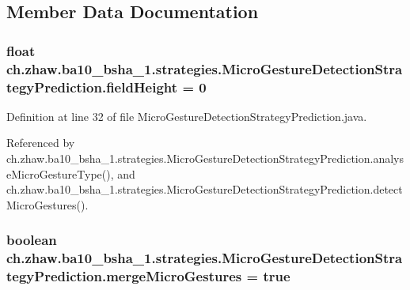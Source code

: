\subsection{Member Data Documentation}
\hypertarget{classch_1_1zhaw_1_1ba10__bsha__1_1_1strategies_1_1MicroGestureDetectionStrategyPrediction_a310e66b34b2d214baa3e43f64509129a}{
\subsubsection[{fieldHeight}]{\setlength{\rightskip}{0pt plus 5cm}float {\bf ch.zhaw.ba10\_\-bsha\_\-1.strategies.MicroGestureDetectionStrategyPrediction.fieldHeight} = 0}}
\label{classch_1_1zhaw_1_1ba10__bsha__1_1_1strategies_1_1MicroGestureDetectionStrategyPrediction_a310e66b34b2d214baa3e43f64509129a}


Definition at line 32 of file MicroGestureDetectionStrategyPrediction.java.

Referenced by ch.zhaw.ba10\_\-bsha\_\-1.strategies.MicroGestureDetectionStrategyPrediction.analyseMicroGestureType(), and ch.zhaw.ba10\_\-bsha\_\-1.strategies.MicroGestureDetectionStrategyPrediction.detectMicroGestures().\hypertarget{classch_1_1zhaw_1_1ba10__bsha__1_1_1strategies_1_1MicroGestureDetectionStrategyPrediction_afdc3a70a63ee24fa10bc8c77729d5423}{
\subsubsection[{mergeMicroGestures}]{\setlength{\rightskip}{0pt plus 5cm}boolean {\bf ch.zhaw.ba10\_\-bsha\_\-1.strategies.MicroGestureDetectionStrategyPrediction.mergeMicroGestures} = true}}
\label{classch_1_1zhaw_1_1ba10__bsha__1_1_1strategies_1_1MicroGestureDetectionStrategyPrediction_afdc3a70a63ee24fa10bc8c77729d5423}


